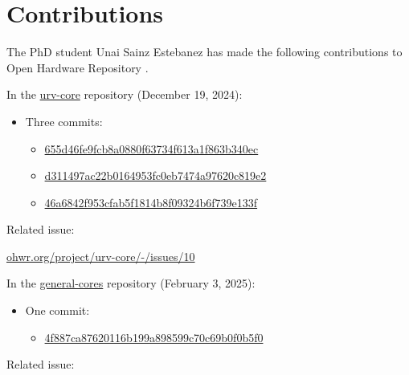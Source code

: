 \section{Contributions}
\label{contrib}

\noindent The PhD student Unai Sainz Estebanez has made the following contributions to Open Hardware Repository \cite{ohwr}.

\vspace{5mm}

\noindent In the \href{https://ohwr.org/project/urv-core}{urv-core} repository (December 19, 2024):

\begin{itemize}
\item Three commits:
    \begin{itemize}
    \item \href{https://ohwr.org/project/urv-core/-/commit/655d46fe9fcb8a0880f63734f613a1f863b340ec}{655d46fe9fcb8a0880f63734f613a1f863b340ec}
    \item \href{https://ohwr.org/project/urv-core/-/commit/d311497ac22b0164953fc0eb7474a97620c819e2}{d311497ac22b0164953fc0eb7474a97620c819e2}
    \item \href{https://ohwr.org/project/urv-core/-/commit/46a6842f953cfab5f1814b8f09324b6f739e133f}{46a6842f953cfab5f1814b8f09324b6f739e133f}
    \end{itemize}
\end{itemize}

\noindent Related issue:

\vspace{5mm}

\href{https://ohwr.org/project/urv-core/-/issues/10}{ohwr.org/project/urv-core/-/issues/10}

\vspace{5mm}

\noindent In the \href{https://ohwr.org/project/general-cores/}{general-cores} repository (February 3, 2025):

\begin{itemize}
\item One commit:
    \begin{itemize}
    \item \href{https://ohwr.org/project/general-cores/-/commit/4f887ca87620116b199a898599c70c69b0f0b5f0}{4f887ca87620116b199a898599c70c69b0f0b5f0}
    \end{itemize}
\end{itemize}

\noindent Related issue:

